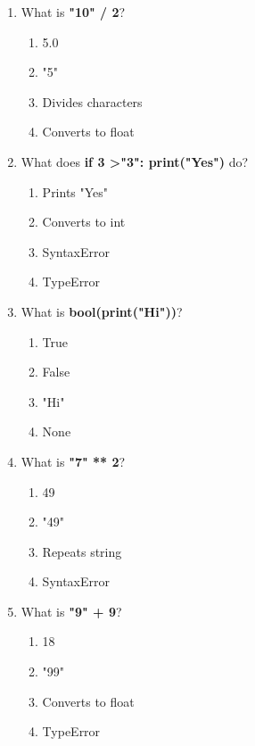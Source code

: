\documentclass{article}
\begin{document}
\begin{multicols*}{4}
\begin{enumerate}
        \item What is \textbf{"10" / 2}?
        \begin{enumerate}[label=(\Alph*)]
            \item 5.0
            \item "5"
            \item Divides characters
            \item Converts to float
        \end{enumerate}

        \item What does \textbf{if 3 \textgreater "3": print("Yes")} do?
        \begin{enumerate}[label=(\Alph*)]
            \item Prints "Yes"
            \item Converts to int
            \item SyntaxError
            \item TypeError
        \end{enumerate}

        \item What is \textbf{bool(print("Hi"))}?
        \begin{enumerate}[label=(\Alph*)]
            \item True
            \item False
            \item "Hi"
            \item None
        \end{enumerate}

        \item What is \textbf{"7" ** 2}?
        \begin{enumerate}[label=(\Alph*)]
            \item 49
            \item "49"
            \item Repeats string
            \item SyntaxError
        \end{enumerate}

        \item What is \textbf{"9" + 9}?
        \begin{enumerate}[label=(\Alph*)]
            \item 18
            \item "99"
            \item Converts to float
            \item TypeError
        \end{enumerate}


\end{enumerate}
\end{multicols*}
\end{document}
